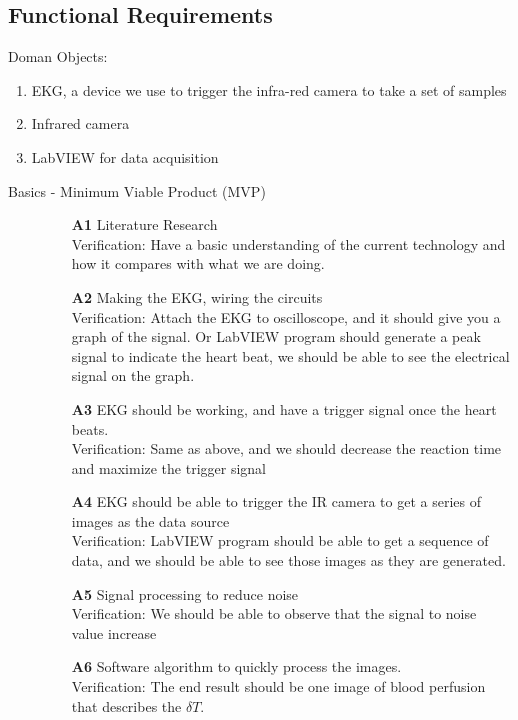 \documentclass[paper=letter, fontsize=11pt]{scrartcl}
\numberwithin{equation}{section}		%
\numberwithin{figure}{section}			%
\numberwithin{table}{section}			%
\begin{document}
\subsection{Functional Requirements}
Doman Objects: 
\begin{enumerate}{}
	\item EKG, a device we use to trigger the infra-red camera to take a set of samples
	\item Infrared camera
	\item LabVIEW for data acquisition
\end{enumerate}
\begin{description}

   \item[Basics - Minimum Viable Product (MVP)] \hspace{1cm}
   	\begin{itemize}
   	\item[\textbf{A1}] Literature Research\\
   	\hfill Verification: Have a basic understanding of the current technology and how it compares with what we are doing.
	\item[\textbf{A2}] Making the EKG, wiring the circuits\\
	\hfill Verification: Attach the EKG to oscilloscope, and it should give you a graph of the signal. Or LabVIEW program should generate a peak signal to indicate the heart beat, we should be able to see the electrical signal on the graph.
   	\item[\textbf{A3}]  EKG should be working, and have a trigger signal once the heart beats.\\
    	\hfill Verification: Same as above, and we should decrease the reaction time and maximize the trigger signal
   	\item[\textbf{A4}]  EKG should be able to trigger the IR camera to get a series of images as the data source\\
    	\hfill Verification: LabVIEW program should be able to get a sequence of data, and we should be able to see those images as they are generated.
   	\item[\textbf{A5}]  Signal processing to reduce noise\\
   	\hfill Verification: We should be able to observe that the signal to noise value increase
	\item[\textbf{A6}] Software algorithm to quickly process the images. \\
   	\hfill Verification: The end result should be one image of blood perfusion that describes the $\delta T$.   
\end{itemize}
  

\end{description}
\end{document}
